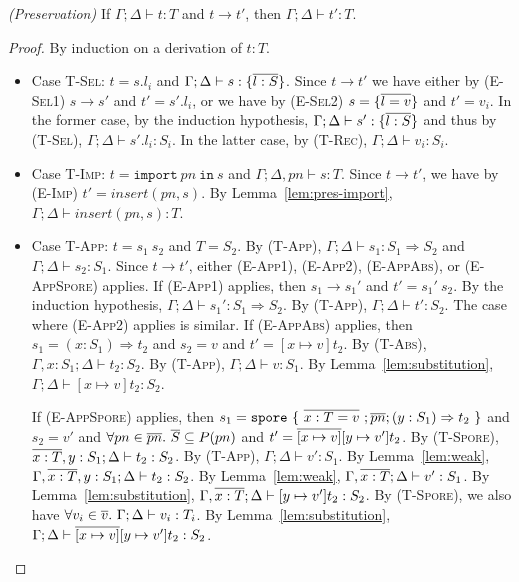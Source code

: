 \begin{theorem}
\emph{(Preservation)}
\label{th:pres}
If $\Gamma ; \Delta \vdash t : T$ and $t \rightarrow t'$, then $\Gamma ; \Delta \vdash t' : T$.
\end{theorem}
\begin{proof}
By induction on a derivation of $t : T$.

\begin{itemize}

\item Case \textsc{T-Sel}: $t = s.l_i$ and $\Gamma ; \Delta \vdash s : \{\overline{l : S}\}$. Since $t \rightarrow t'$ we have either by (\textsc{E-Sel1}) $s \rightarrow s'$ and $t' = s'.l_i$, or we have by (\textsc{E-Sel2}) $s = \{\overline{l = v}\}$ and $t' = v_i$. In the former case, by the induction hypothesis, $\Gamma ; \Delta \vdash s' : \{\overline{l : S}\}$ and thus by (\textsc{T-Sel}), $\Gamma ; \Delta \vdash s'.l_i : S_i$. In the latter case, by (\textsc{T-Rec}), $\Gamma ; \Delta \vdash v_i : S_i$.

\item Case \textsc{T-Imp}: $t = \texttt{import}~pn~\texttt{in}~s$ and $\Gamma ; \Delta, pn \vdash s : T$. Since $t \rightarrow t'$, we have by (\textsc{E-Imp}) $t' = insert(pn, s)$. By Lemma~\ref{lem:pres-import}, $\Gamma ; \Delta \vdash insert(pn, s) : T$.

\item Case \textsc{T-App}: $t = s_1~s_2$ and $T = S_2$. By (\textsc{T-App}), $\Gamma ; \Delta \vdash s_1 : S_1 \Rightarrow S_2$ and $\Gamma ; \Delta \vdash s_2 : S_1$. Since $t \rightarrow t'$, either (\textsc{E-App1}), (\textsc{E-App2}), (\textsc{E-AppAbs}), or (\textsc{E-AppSpore}) applies. If (\textsc{E-App1}) applies, then $s_1 \rightarrow s_1'$ and $t' = s_1'~s_2$. By the induction hypothesis, $\Gamma ; \Delta \vdash s_1' : S_1 \Rightarrow S_2$. By (\textsc{T-App}), $\Gamma ; \Delta \vdash t' : S_2$. The case where (\textsc{E-App2}) applies is similar. If (\textsc{E-AppAbs}) applies, then $s_1 = (x : S_1) \Rightarrow t_2$ and $s_2 = v$ and $t' = [x \mapsto v]t_2$. By (\textsc{T-Abs}), $\Gamma, x:S_1 ; \Delta \vdash t_2 : S_2$. By (\textsc{T-App}), $\Gamma ; \Delta \vdash v : S_1$. By Lemma~\ref{lem:substitution}, $\Gamma ; \Delta \vdash [x \mapsto v]t_2 : S_2$.

If (\textsc{E-AppSpore}) applies, then $s_1 = \texttt{spore}~\{~\overline{x : T = v}~; \overline{pn}; (y: S_1) \Rightarrow t_2~\}$ and $s_2 = v'$ and $\forall pn \in \overline{pn}.~\overline{S} \subseteq P(pn)$ and $t' = \overline{[x \mapsto v]}[y \mapsto v']t_2$. By (\textsc{T-Spore}), $\overline{x:T}, y:S_1 ; \Delta \vdash t_2 : S_2$. By (\textsc{T-App}), $\Gamma ; \Delta \vdash v' : S_1$. By Lemma~\ref{lem:weak}, $\Gamma, \overline{x:T}, y:S_1 ; \Delta \vdash t_2 : S_2$. By Lemma~\ref{lem:weak}, $\Gamma, \overline{x:T} ; \Delta \vdash v' : S_1$. By Lemma~\ref{lem:substitution}, $\Gamma, \overline{x:T} ; \Delta \vdash [y \mapsto v']t_2 : S_2$. By (\textsc{T-Spore}), we also have $\forall v_i \in \overline{v}.~\Gamma ; \Delta \vdash v_i : T_i$. By Lemma~\ref{lem:substitution}, $\Gamma ; \Delta \vdash \overline{[x \mapsto v]}[y \mapsto v']t_2 : S_2$.


\end{itemize}
\end{proof}
